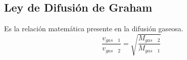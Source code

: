\documentclass[../main.tex]{subfiles}
\begin{document}
\subsection{Ley de Difusión de Graham}
Es la relación matemática presente en la difusión gaseosa.
\[ \frac{v_{gas\quad 1}}{v_{gas\quad 2}} =
 \sqrt{\frac{M_{gas\quad 2}}{M_{gas\quad 1}}} \]
\end{document}
